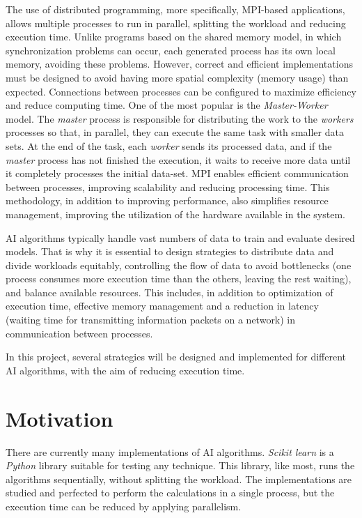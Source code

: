 		
	The use of distributed programming, more specifically, MPI-based applications, allows multiple processes to run in parallel, splitting the workload and reducing execution time. Unlike programs based on the shared memory model, in which synchronization problems can occur, each generated process has its own local memory, avoiding these problems. However, correct and efficient implementations must be designed to avoid having more spatial complexity (memory usage) than expected. Connections between processes can be configured to maximize efficiency and reduce computing time. One of the most popular is the \textit{Master-Worker} model. The \textit{master} process is responsible for distributing the work to the \textit{workers} processes so that, in parallel, they can execute the same task with smaller data sets. At the end of the task, each \textit{worker} sends its processed data, and if the \textit{master} process has not finished the execution, it waits to receive more data until it completely processes the initial data-set. MPI enables efficient communication between processes, improving scalability and reducing processing time. This methodology, in addition to improving performance, also simplifies resource management, improving the utilization of the hardware available in the system.
	
	
	AI algorithms typically handle vast numbers of data to train and evaluate desired models. That is why it is essential to design strategies to distribute data and divide workloads equitably, controlling the flow of data to avoid bottlenecks (one process consumes more execution time than the others, leaving the rest waiting), and balance available resources. This includes, in addition to optimization of execution time, effective memory management and a reduction in latency (waiting time for transmitting information packets on a network) in communication between processes. 
	
	In this project, several strategies will be designed and implemented for different AI algorithms, with the aim of reducing execution time.



\section{Motivation}
	
	There are currently many implementations of AI algorithms. \textit{Scikit learn} is a \textit{Python} library suitable for testing any technique. This library, like most, runs the algorithms sequentially, without splitting the workload. The implementations are studied and perfected to perform the calculations in a single process, but the execution time can be reduced by applying parallelism. 
	
